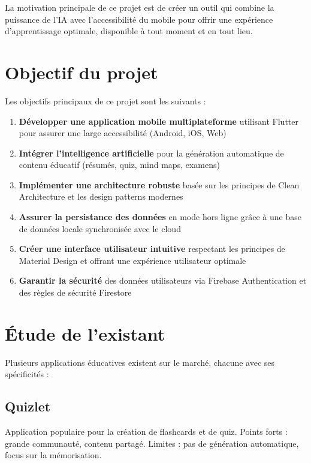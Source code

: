 \documentclass[12pt,a4paper]{report}
\begin{document}
La motivation principale de ce projet est de créer un outil qui combine la puissance de l'IA avec l'accessibilité du mobile pour offrir une expérience d'apprentissage optimale, disponible à tout moment et en tout lieu.

\section{Objectif du projet}

Les objectifs principaux de ce projet sont les suivants :

\begin{enumerate}
    \item \textbf{Développer une application mobile multiplateforme} utilisant Flutter pour assurer une large accessibilité (Android, iOS, Web)
    
    \item \textbf{Intégrer l'intelligence artificielle} pour la génération automatique de contenu éducatif (résumés, quiz, mind maps, examens)
    
    \item \textbf{Implémenter une architecture robuste} basée sur les principes de Clean Architecture et les design patterns modernes
    
    \item \textbf{Assurer la persistance des données} en mode hors ligne grâce à une base de données locale synchronisée avec le cloud
    
    \item \textbf{Créer une interface utilisateur intuitive} respectant les principes de Material Design et offrant une expérience utilisateur optimale
    
    \item \textbf{Garantir la sécurité} des données utilisateurs via Firebase Authentication et des règles de sécurité Firestore
\end{enumerate}

\section{Étude de l'existant}

Plusieurs applications éducatives existent sur le marché, chacune avec ses spécificités :

\subsection{Quizlet}
Application populaire pour la création de flashcards et de quiz. Points forts : grande communauté, contenu partagé. Limites : pas de génération automatique, focus sur la mémorisation.
\end{document}
